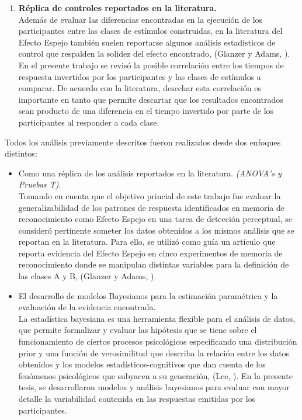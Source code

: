 \begin{enumerate}
\item \textbf{Réplica de controles reportados en la literatura.}\\

Además de evaluar las diferencias encontradas en la ejecución de los participantes entre las clases de estímulos construidas, en la literatura del Efecto Espejo también suelen reportarse algunos análisis estadísticos de control que respalden la solidez del efecto encontrado, (Glanzer y Adams, \citeyear{Glanzer1990}). En el presente trabajo se revisó la posible correlación entre los tiempos de respuesta invertidos por los participantes y las clases de estímulos a comparar. De acuerdo con la literatura, desechar esta correlación es importante en tanto que permite descartar que los resultados encontrados sean producto de una diferencia en el tiempo invertido por parte de los participantes al responder a cada clase.\\
\end{enumerate}

Todos los análisis previamente descritos fueron realizados desde dos enfoques distintos:

\begin{itemize}
\item Como una réplica de los análisis reportados en la literatura. \textit{(ANOVA's y Pruebas T)}.\\

Tomando en cuenta que el objetivo princial de este trabajo fue evaluar la generalizabilidad de los patrones de respuesta identificados en memoria de reconocimiento como Efecto Espejo en una tarea de detección perceptual, se consideró pertinente someter los datos obtenidos a los mismos análisis que se reportan en la literatura. Para ello, se utilizó como guía un artículo que reporta evidencia del Efecto Espejo en cinco experimentos de memoria de reconocimiento donde se manipulan distintas variables para la definición de las clases A y B, (Glanzer y Adams, \citeyear{Glanzer1990}).\\

\item El desarrollo de modelos Bayesianos para la estimación paramétrica y la evaluación de la evidencia encontrada.\\

La estadística bayesiana es una herramienta flexible para el análisis de datos, que permite formalizar y evaluar las hipótesis que se tiene sobre el funcionamiento de ciertos procesos psicológicos especificando una distribución prior y una función de verosimilitud que describa la relación entre los datos obtenidos y los modelos estadísticos-cognitivos que dan cuenta de los fenómenos psicológicos que subyacen a su generación, (Lee, \citeyear{Lee2011}). En la presente tesis, se desarrollaron modelos y análisis bayesianos para evaluar con mayor detalle la variabilidad contenida en las respuestas emitidas por los participantes.\\
\end{itemize}










